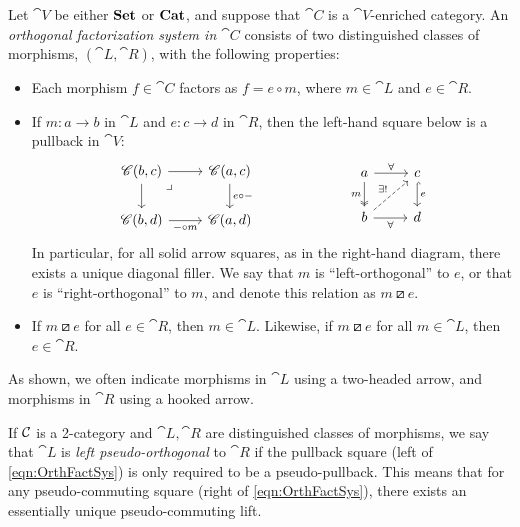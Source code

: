 \documentclass[11pt,oneside,article]{memoir}
\begin{document}
\begin{definition}\label{def:orthogonal}
   Let $\cat{V}$ be either $\mathbf{Set}$ or $\mathbf{Cat}$, and suppose that $\cat{C}$ is a $\cat{V}$-enriched
   category. An \emph{orthogonal factorization system in $\cat{C}$} consists of two distinguished
   classes of morphisms, $(\cat{L},\cat{R})$, with the following properties:
   \begin{itemize}
      \item Each morphism $f\in\cat{C}$ factors as $f=e\circ m$, where $m\in\cat{L}$ and
         $e\in\cat{R}$.
      \item If $m\colon a\to b$ in $\cat{L}$ and $e\colon c\to d$ in $\cat{R}$, then the left-hand
         square below is a pullback in $\cat{V}$:
         \begin{equation}\label{eqn:OrthFactSys}
            \begin{tikzcd}
               \cat{C}(b,c)\ar[r]\ar[d]\ar[rd,phantom,"\lrcorner" very near start]&\cat{C}(a,c)\ar[d,"e\circ -"]\\
               \cat{C}(b,d)\ar[r,"-\circ m"']&\cat{C}(a,d)
            \end{tikzcd}
            \hspace{.9in}
            \begin{tikzcd}
               a\ar[r,"\forall"]\ar[d,two heads,"m"']&c\ar[d,hook, "e"]\\
               b\ar[r,"\forall"']\ar[ur,dashed,"\exists!"]&d
            \end{tikzcd}
         \end{equation}
         In particular, for all solid arrow squares, as in the right-hand diagram, there exists a
         unique diagonal filler. We say that $m$ is ``left-orthogonal'' to $e$, or that $e$ is
         ``right-orthogonal'' to $m$, and denote this relation as $m\boxslash e$.
      \item If $m\boxslash e$ for all $e\in\cat{R}$, then $m\in\cat{L}$. Likewise, if $m\boxslash e$
         for all $m\in\cat{L}$, then $e\in\cat{R}$.
   \end{itemize}
   As shown, we often indicate morphisms in $\cat{L}$ using a two-headed arrow, and morphisms in
   $\cat{R}$ using a hooked arrow.
\end{definition}

If $\mathcal{C}$ is a 2-category and $\cat{L}, \cat{R}$ are distinguished classes of morphisms, we say
that $\cat{L}$ is \emph{left pseudo-orthogonal} to $\cat{R}$ if the pullback square (left of
\eqref{eqn:OrthFactSys}) is only required to be a pseudo-pullback. This means that for any
pseudo-commuting square (right of \eqref{eqn:OrthFactSys}), there exists an essentially unique
pseudo-commuting lift.
\end{document}
